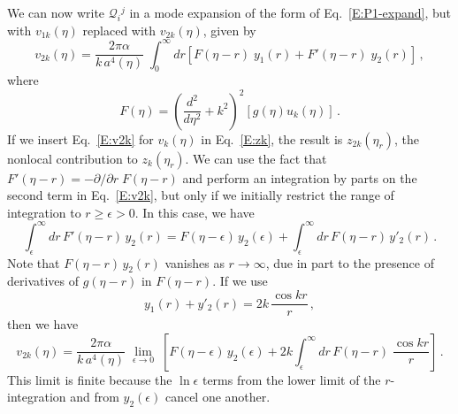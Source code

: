 \documentclass[preprint,prd,showpacs,superscriptaddress]{revtex4}
\begin{document}
We can now write $\mathcal{Q}_{i}{}^{j}$ in a mode expansion of the form of Eq.~\eqref{E:P1-expand}, but with 
$v_{1k}(\eta)$ replaced with $v_{2k}(\eta)$, given by
\begin{equation}
v_{2k}(\eta) = \frac{2\pi \alpha}{k\, a^4(\eta)}\; \int^{\infty}_{0}\!dr \left[ F(\eta-r)\; y_1(r) +  F'(\eta-r)\; y_2(r)\right]\,,
\label{E:v2k}
\end{equation}
where
\begin{equation}
F(\eta) =\left(\frac{d^{2}}{d\eta^{2}}+k^{2}\right)^{2}\left[g(\eta)u_k(\eta)\right]\,.
\label{E:F}
\end{equation}
If we insert Eq.~\eqref{E:v2k} for  $v_{k}(\eta)$   in Eq.~\eqref{E:zk}, the result is $z_{2k}(\eta_r)$, the nonlocal
contribution to  $z_{k}(\eta_r)$. We can use the fact that $F'(\eta-r) = -\partial/{\partial r}\; F(\eta-r)$ and perform
an integration by parts on the second term in Eq.~\eqref{E:v2k}, but only if we initially restrict the range of integration
to $r \geq \epsilon >0$. In this case, we have
\begin{equation}
\int^{\infty}_{\epsilon}\!dr \,F'(\eta-r)\, y_2(r) =  F(\eta-\epsilon)\, y_2(\epsilon)  + \int^{\infty}_{\epsilon}\!dr \,F(\eta-r)\, y'_2(r) \,.
\end{equation}
Note that $F(\eta-r)\, y_2(r)$ vanishes as $r \rightarrow \infty$, due in part to the presence of derivatives of $g(\eta-r)$ in
$F(\eta-r)$. If we use
\begin{equation}
y_1(r) + y'_2(r) = 2k\, \frac{\cos kr}{r}\,,
\end{equation}
then we have
\begin{equation}
v_{2k}(\eta) = \frac{2\pi \alpha}{k\, a^4(\eta)}\; \lim_{\epsilon \to 0}\; \left[F(\eta-\epsilon)\, y_2(\epsilon)  + 
2 k \int^{\infty}_{\epsilon}\!dr \,F(\eta-r)\; \frac{\cos kr}{r} \right]\,.
\label{E:v2}
\end{equation}
This limit is finite because the $\ln \epsilon $ terms from the lower limit of the $r$-integration and from $y_2(\epsilon)$
cancel one another.
\end{document}
